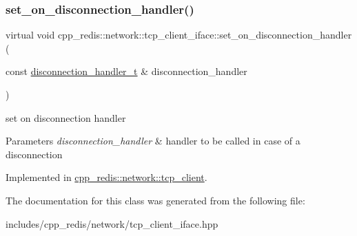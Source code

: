 \subsubsection{\texorpdfstring{set\+\_\+on\+\_\+disconnection\+\_\+handler()}{set\_on\_disconnection\_handler()}}
{\footnotesize\ttfamily virtual void cpp\+\_\+redis\+::network\+::tcp\+\_\+client\+\_\+iface\+::set\+\_\+on\+\_\+disconnection\+\_\+handler (\begin{DoxyParamCaption}\item[{const \mbox{\hyperlink{classcpp__redis_1_1network_1_1tcp__client__iface_a9a7d5942205db8be03da581a848b8ec0}{disconnection\+\_\+handler\+\_\+t}} \&}]{disconnection\+\_\+handler }\end{DoxyParamCaption})\hspace{0.3cm}{\ttfamily [pure virtual]}}

set on disconnection handler


\begin{DoxyParams}{Parameters}
{\em disconnection\+\_\+handler} & handler to be called in case of a disconnection \\
\hline
\end{DoxyParams}


Implemented in \mbox{\hyperlink{classcpp__redis_1_1network_1_1tcp__client_a24ccdf6dc467aac13cb832a395adb38d}{cpp\+\_\+redis\+::network\+::tcp\+\_\+client}}.



The documentation for this class was generated from the following file\+:\begin{DoxyCompactItemize}
\item 
includes/cpp\+\_\+redis/network/tcp\+\_\+client\+\_\+iface.\+hpp\end{DoxyCompactItemize}
